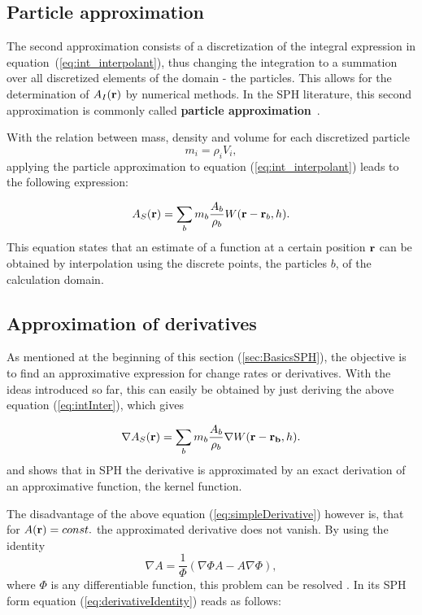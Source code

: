\documentclass[11pt,a4paper,twoside]{report}
\begin{document}
\subsection{Particle approximation}
The second approximation consists of a discretization of the integral
expression in equation~(\ref{eq:int_interpolant}), thus changing the integration
to a summation over all discretized elements of the domain - the particles. 
This allows for the determination of $A_I(\bf{r})$ by numerical methods. In the SPH
literature, this second approximation is commonly called {\bf particle
approximation}~\cite{Liu2003}.

With the relation between mass, density and volume for each discretized particle
\begin{equation}
m_i=\rho_i V_i,
\end{equation}
applying the particle approximation to equation (\ref{eq:int_interpolant}) leads to the following expression:

\begin{equation}
\label{eq:intInter}
A_S({\bf r})=\sum_b m_b \frac{A_b}{\rho_b}W({\bf r}-{\bf r}_b,h).
\end{equation}
This equation states that an estimate of a function at a certain position ${\bf r}$ can be obtained by interpolation using the discrete points, the particles $b$, of the calculation domain. 


\subsection{Approximation of derivatives}

As mentioned at the beginning of this section (\ref{sec:BasicsSPH}), the objective is to find an approximative expression for change rates or derivatives.
With the ideas introduced so far, this can easily be obtained by just deriving the above equation (\ref{eq:intInter}), which gives~\cite{Monaghan2005, Liu2003} 

\begin{equation}
\label{eq:simpleDerivative}
\nabla A_S({\bf r})=\sum_b m_b \frac{A_b}{\rho_b}\nabla W({\bf r}-{\bf r_b},h).
\end{equation}
and shows that in SPH the derivative is approximated by an exact derivation of an approximative function, the kernel function.

The disadvantage of the above equation (\ref{eq:simpleDerivative}) however is, that for
$A({\bf r})=const.$ the approximated derivative does not vanish. By using the identity
\begin{equation}
\label{eq:derivativeIdentity}
\nabla A = \frac{1}{\Phi}(\nabla {\Phi A}-A\nabla \Phi),
\end{equation}
where $\Phi$ is any differentiable function, this problem can be resolved \cite{Monaghan2005}. In its
SPH form equation (\ref{eq:derivativeIdentity}) reads as follows:
\end{document}
